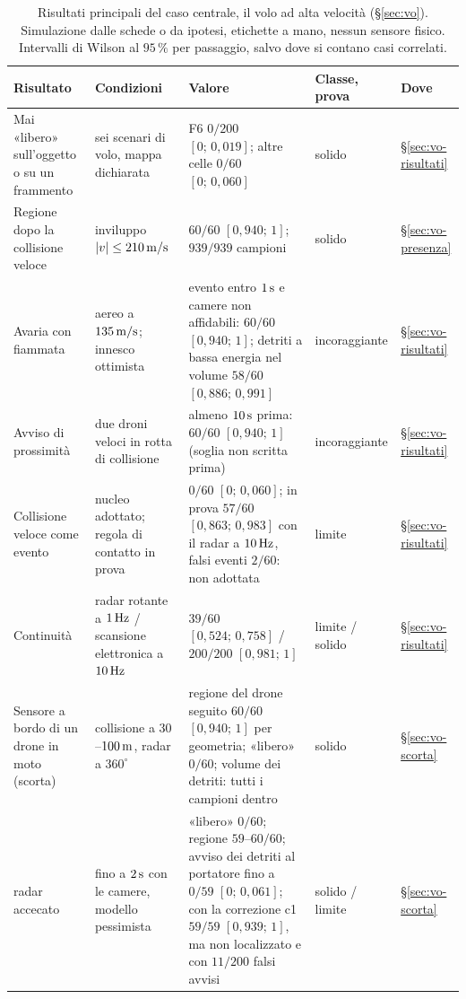 \begin{table}[!htbp]
\centering\footnotesize
\setlength{\tabcolsep}{4pt}
\caption{Risultati principali del caso centrale, il volo ad alta velocità (\S\ref{sec:vo}). Simulazione dalle schede o da ipotesi, etichette a mano, nessun sensore fisico. Intervalli di Wilson al $95\,\%$ per passaggio, salvo dove si contano casi correlati.}\label{tab:intro-sintesi-volo}
\begin{tabularx}{\textwidth}{@{}>{\RaggedRight\arraybackslash}p{3.1cm}>{\RaggedRight\arraybackslash}p{3.3cm}L>{\RaggedRight\arraybackslash}p{2.0cm}>{\RaggedRight\arraybackslash}p{1.05cm}@{}}
\toprule
Risultato & Condizioni & Valore & Classe, prova & Dove\\
\midrule
Mai «libero» sull'oggetto o su un frammento & sei scenari di volo, mappa dichiarata & F6 $0/200$ $[0;\,0{,}019]$; altre celle $0/60$ $[0;\,0{,}060]$ & solido  & \S\ref{sec:vo-risultati}\\
Regione dopo la collisione veloce & inviluppo $|v|\le210\,\mathrm{m/s}$ & $60/60$ $[0{,}940;\,1]$; $939/939$ campioni & solido  & \S\ref{sec:vo-presenza}\\
Avaria con fiammata & aereo a $135\,\mathrm{m/s}$; innesco ottimista & evento entro $1\,\mathrm{s}$ e camere non affidabili: $60/60$ $[0{,}940;\,1]$; detriti a bassa energia nel volume $58/60$ $[0{,}886;\,0{,}991]$ & incoraggiante  & \S\ref{sec:vo-risultati}\\
Avviso di prossimità & due droni veloci in rotta di collisione & almeno $10\,\mathrm{s}$ prima: $60/60$ $[0{,}940;\,1]$ (soglia non scritta prima) & incoraggiante  & \S\ref{sec:vo-risultati}\\
Collisione veloce come evento & nucleo adottato; regola di contatto in prova & $0/60$ $[0;\,0{,}060]$; in prova $57/60$ $[0{,}863;\,0{,}983]$ con il radar a $10\,\mathrm{Hz}$, falsi eventi $2/60$: non adottata & limite  & \S\ref{sec:vo-risultati}\\
Continuità & radar rotante a $1\,\mathrm{Hz}$ / scansione elettronica a $10\,\mathrm{Hz}$ & $39/60$ $[0{,}524;\,0{,}758]$ / $200/200$ $[0{,}981;\,1]$ & limite / solido  & \S\ref{sec:vo-risultati}\\
Sensore a bordo di un drone in moto (scorta) & collisione a $30$--$100\,\mathrm{m}$, radar a $360^\circ$ & regione del drone seguito $60/60$ $[0{,}940;\,1]$ per geometria; «libero» $0/60$; volume dei detriti: tutti i campioni dentro & solido  & \S\ref{sec:vo-scorta}\\
\quad radar accecato & fino a $2\,\mathrm{s}$ con le camere, modello pessimista & «libero» $0/60$; regione $59$--$60/60$; avviso dei detriti al portatore fino a $0/59$ $[0;\,0{,}061]$; con la correzione c1 $59/59$ $[0{,}939;\,1]$, ma non localizzato e con $11/200$ falsi avvisi & solido / limite  & \S\ref{sec:vo-scorta}\\

\end{tabularx}
\end{table}

